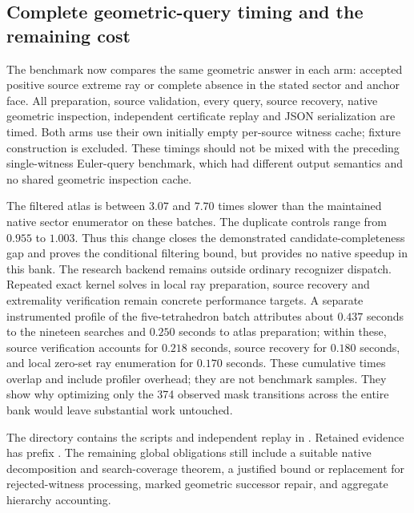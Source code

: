\subsection{Complete geometric-query timing and the remaining cost}

The benchmark now compares the same geometric answer in each arm:
accepted positive source extreme ray or complete absence in the stated
sector and anchor face.  All preparation, source validation, every
query, source recovery, native geometric inspection, independent
certificate replay and JSON serialization are timed.  Both arms use
their own initially empty per-source witness cache; fixture construction
is excluded.  These timings should not be mixed with the preceding
single-witness Euler-query benchmark, which had different output
semantics and no shared geometric inspection cache.

\begin{table}[ht]
\centering\small

\caption{Complete accepted-extreme query batches, with seven randomized
paired rounds and three duplicate filtered-arm controls. Ratios are
medians of paired ratios.}
\label{tab:filtered-atlas-times}
\end{table}

The filtered atlas is between $3.07$ and $7.70$ times slower than the
maintained native sector enumerator on these batches.  The duplicate
controls range from $0.955$ to $1.003$.  Thus this change closes the
demonstrated candidate-completeness gap and proves the conditional
filtering bound, but provides no native speedup in this bank.  The
research backend remains outside ordinary recognizer dispatch.
Repeated exact kernel solves in local ray preparation, source recovery
and extremality verification remain concrete performance targets.
A separate instrumented profile of the five-tetrahedron batch attributes
about $0.437$ seconds to the nineteen searches and $0.250$ seconds to
atlas preparation; within these, source verification accounts for
$0.218$ seconds, source recovery for $0.180$ seconds, and local zero-set
ray enumeration for $0.170$ seconds.  These cumulative times overlap
and include profiler overhead; they are not benchmark samples.  They
show why optimizing only the 374 observed mask transitions across the
entire bank would leave substantial work untouched.

The directory  contains the
 scripts and independent replay in
.
Retained evidence has prefix .
The remaining global obligations still
include a suitable native decomposition and search-coverage theorem,
a justified bound or replacement for rejected-witness processing,
marked geometric successor repair, and aggregate hierarchy accounting.
